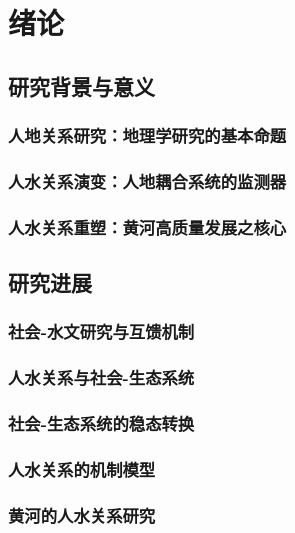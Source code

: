 \chapter{绪论}
\label{cha:introduction}

\section{研究背景与意义}
\label{sec:background}

\subsection{人地关系研究：地理学研究的基本命题}

\subsection{人水关系演变：人地耦合系统的监测器}

\subsection{人水关系重塑：黄河高质量发展之核心}

\section{研究进展}
\label{sec:progress}

\subsection{社会-水文研究与互馈机制}

\subsection{人水关系与社会-生态系统}

\subsection{社会-生态系统的稳态转换}

\subsection{人水关系的机制模型}

\subsection{黄河的人水关系研究}

